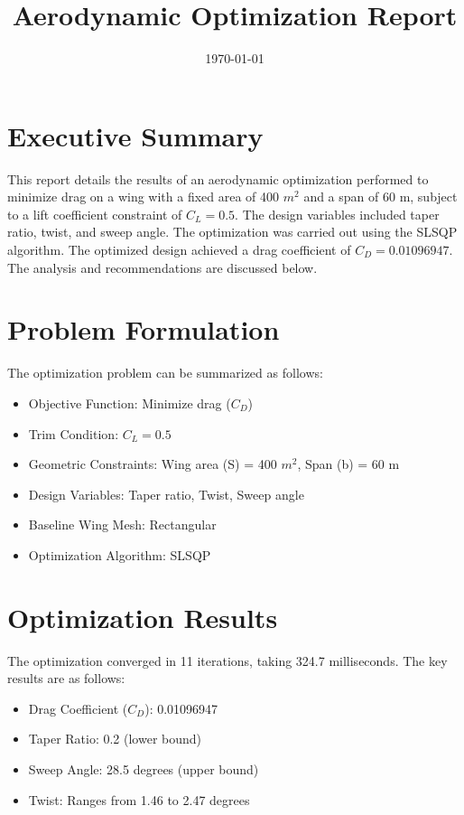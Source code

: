 \documentclass{article}
\begin{document}
\title{Aerodynamic Optimization Report}
\date{\today}
\maketitle

\section{Executive Summary}
This report details the results of an aerodynamic optimization performed to minimize drag on a wing with a fixed area of 400 $m^2$ and a span of 60 m, subject to a lift coefficient constraint of $C_L = 0.5$. The design variables included taper ratio, twist, and sweep angle. The optimization was carried out using the SLSQP algorithm. The optimized design achieved a drag coefficient of $C_D = 0.01096947$. The analysis and recommendations are discussed below.

\section{Problem Formulation}
The optimization problem can be summarized as follows:
\begin{itemize}
    \item Objective Function: Minimize drag ($C_D$)
    \item Trim Condition: $C_L = 0.5$
    \item Geometric Constraints: Wing area (S) = 400 $m^2$, Span (b) = 60 m
    \item Design Variables: Taper ratio, Twist, Sweep angle
    \item Baseline Wing Mesh: Rectangular
    \item Optimization Algorithm: SLSQP
\end{itemize}

\section{Optimization Results}
The optimization converged in 11 iterations, taking 324.7 milliseconds. The key results are as follows:
\begin{itemize}
    \item Drag Coefficient ($C_D$): 0.01096947
    \item Taper Ratio: 0.2 (lower bound)
    \item Sweep Angle: 28.5 degrees (upper bound)
    \item Twist: Ranges from 1.46 to 2.47 degrees
\end{itemize}
\end{document}
